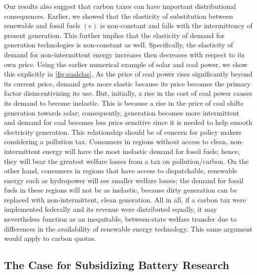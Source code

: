 \documentclass[11pt,a4paper,leqno]{extarticle}
\begin{document}
	Our results also suggest that carbon taxes can have important distributional consequences. Earlier, we showed that the elasticity of substitution between renewable and fossil fuels $(e)$ is non-constant and falls with the intermittency of present generation. This further implies that the elasticity of demand for generation technologies is non-constant as well. Specifically, the elasticity of demand for non-intermittent energy increases then decreases with respect to its own price. Using the earlier numerical example of solar and coal power, we show this explicitly in \autoref{fig:coalelas}. As the price of coal power rises significantly beyond its current price, demand gets more elastic because its price becomes the primary factor disincentivizing its use. But, initially, a rise in the cost of coal power causes its demand to become inelastic. This is because a rise in the price of coal shifts generation towards solar;  consequently, generation becomes more intermittent and demand for coal becomes less price sensitive since it is needed to help smooth electricity generation. This relationship should be of concern for policy makers considering a pollution tax. Consumers in regions without access to clean, non-intermittent energy will have the most inelastic demand for fossil fuels; hence, they will bear the greatest welfare losses from a tax on pollution/carbon. On the other hand, consumers in regions that have access to dispatchable, renewable energy such as hydropower will see smaller welfare losses; the demand for fossil fuels in these regions will not be as inelastic, because dirty generation can be replaced with non-intermittent, clean generation. All in all, if a carbon tax were implemented federally and its revenue were distributed equally, it may nevertheless function as an inequitable, between-state welfare transfer due to differences in the availability of renewable energy technology. This same argument would apply  to carbon quotas.
	
	
	
	\subsection{The Case for Subsidizing Battery Research}
	
\end{document}
